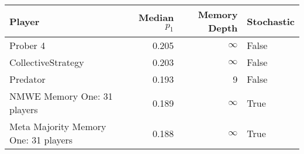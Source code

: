 \begin{tabular}{lrrl}
\toprule
                               Player &  Median $p_1$ &  Memory Depth & Stochastic \\
\midrule
                             Prober 4 &         0.205 &            \(\infty\) &      False \\
                   CollectiveStrategy &         0.203 &            \(\infty\) &      False \\
                             Predator &         0.193 &             9 &      False \\
          NMWE Memory One: 31 players &         0.189 &            \(\infty\) &       True \\
 Meta Majority Memory One: 31 players &         0.188 &            \(\infty\) &       True \\
\bottomrule
\end{tabular}
